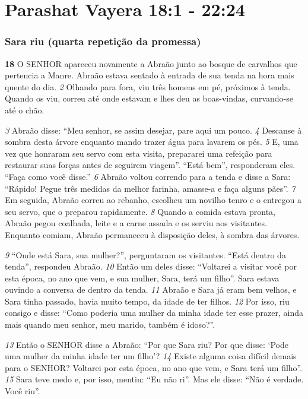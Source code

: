\section*{Parashat Vayera 18:1 - 22:24}

\subsubsection*{Sara riu (quarta repetição da promessa)}

\textbf{\large 18}
 O SENHOR apareceu novamente a Abraão junto ao bosque de carvalhos que
pertencia a Manre. Abraão estava sentado à entrada de sua tenda na hora mais
quente do dia. 
\textit{\tiny 2}
Olhando para fora, viu três homens em pé, próximos à tenda.
Quando os viu, correu até onde estavam e lhes deu as boas-vindas, curvando-se
até o chão.

\bigskip   
\textit{\tiny 3}
Abraão disse: “Meu senhor, se assim desejar, pare aqui um pouco. 
\textit{\tiny 4}
Descanse à
sombra desta árvore enquanto mando trazer água para lavarem os pés. 
\textit{\tiny 5}
E, uma
vez que honraram seu servo com esta visita, prepararei uma refeição para
restaurar suas forças antes de seguirem viagem”.
   “Está bem”, responderam eles. “Faça como você disse.”
\textit{\tiny 6}
Abraão voltou correndo para a tenda e disse a Sara: “Rápido! Pegue três
medidas da melhor farinha, amasse-a e faça alguns pães”. 
\textit{\tiny 7}
Em seguida, Abraão
correu ao rebanho, escolheu um novilho tenro e o entregou a seu servo, que o
preparou rapidamente. 
\textit{\tiny 8}
Quando a comida estava pronta, Abraão pegou coalhada,
leite e a carne assada e os serviu aos visitantes. Enquanto comiam, Abraão
permaneceu à disposição deles, à sombra das árvores.

\bigskip   
\textit{\tiny 9}
“Onde está Sara, sua mulher?”, perguntaram os visitantes.
   “Está dentro da tenda”, respondeu Abraão.
\textit{\tiny 10}
Então um deles disse: “Voltarei a visitar você por esta época, no ano que vem,
e sua mulher, Sara, terá um filho”.
   Sara estava ouvindo a conversa de dentro da tenda. 
\textit{\tiny 11}
Abraão e Sara já eram
bem velhos, e Sara tinha passado, havia muito tempo, da idade de ter filhos. 
\textit{\tiny 12}
Por
isso, riu consigo e disse: “Como poderia uma mulher da minha idade ter esse
prazer, ainda mais quando meu senhor, meu marido, também é idoso?”.

\bigskip   
\textit{\tiny 13}
Então o SENHOR disse a Abraão: “Por que Sara riu? Por que disse: ‘Pode uma
mulher da minha idade ter um filho’? 
\textit{\tiny 14}
Existe alguma coisa difícil demais para o
SENHOR? Voltarei por esta época, no ano que vem, e Sara terá um filho”.
\textit{\tiny 15}
Sara teve medo e, por isso, mentiu: “Eu não ri”.
   Mas ele disse: “Não é verdade. Você riu”.

